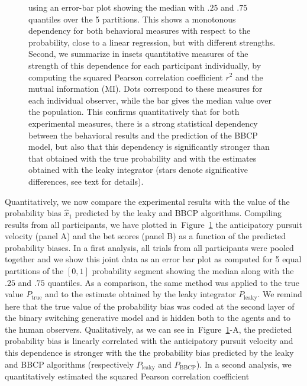 \documentclass[10pt,letterpaper]{article}
\newcommand{\seeFig}[1]{Figure~\ref{fig:#1}}
\begin{document}
\begin{figure}
{using an error-bar plot showing the median with $.25$ and $.75$ quantiles
over the 5 partitions.
This shows a monotonous dependency for both behavioral measures with respect to the probability,
close to a linear regression, but with different strengths.
Second, we summarize in insets  quantitative measures of the strength of this dependence for each participant individually,
by computing the squared Pearson correlation coefficient $r^2$
and the mutual information (MI).
Dots correspond to these measures for each individual observer,
while the bar gives the median value over the population.
This confirms quantitatively that for both experimental measures,
there is a strong statistical dependency between
the behavioral results and the prediction of the BBCP model,
but also that this dependency is significantly stronger than that obtained
with the true probability and with the estimates obtained with the leaky integrator
(stars denote significative differences, see text for details).
}
\label{fig:results_psycho_all}
\end{figure}
Quantitatively, we now compare the experimental results
with the value of the probability bias $\hat{x}_1$
predicted by the leaky and BBCP algorithms.
Compiling results from all participants,
we have plotted in~\seeFig{results_psycho_all}
the anticipatory pursuit velocity (panel A) and the bet scores (panel B)
as a function of the predicted probability biases.
In a first analysis, all trials from all participants were pooled together
and we show this joint data as an error bar plot
as computed for 5 equal partitions of the $[0, 1]$ probability segment
showing the median along with the $.25$ and $.75$ quantiles.
As a comparison, the same method was applied to the true value $P_{\text{true}}$ and
to the estimate obtained by the leaky integrator  $P_{\text{leaky}}$.
We remind here that the true value of the probability bias
was coded at the second layer of the binary switching generative model and
is hidden both to the agents and to the human observers.
%
Qualitatively, as we can see in~\seeFig{results_psycho_all}-A,
the predicted probability bias
is linearly correlated with the anticipatory pursuit velocity
and this dependence is stronger with the
the probability bias predicted by the leaky and BBCP algorithms
(respectively $P_{\text{leaky}}$ and $P_{\text{BBCP}}$).
In a second analysis, we quantitatively estimated the squared Pearson correlation coefficient
\end{document}
